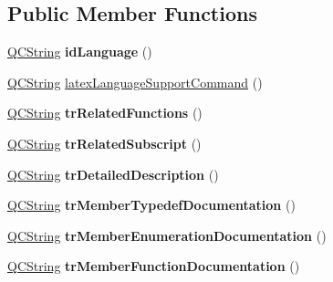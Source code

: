 \subsection*{Public Member Functions}
\begin{DoxyCompactItemize}
\item 
\mbox{\label{class_translator_dutch_aa43227f39ea2263932f49f851b350ea5}} 
\mbox{\hyperlink{class_q_c_string}{Q\+C\+String}} {\bfseries id\+Language} ()
\item 
\mbox{\hyperlink{class_q_c_string}{Q\+C\+String}} \mbox{\hyperlink{class_translator_dutch_a325c81f044aba5c86da2e2741a092119}{latex\+Language\+Support\+Command}} ()
\item 
\mbox{\label{class_translator_dutch_a9d8d21cbfa775b29b58c7b92de220959}} 
\mbox{\hyperlink{class_q_c_string}{Q\+C\+String}} {\bfseries tr\+Related\+Functions} ()
\item 
\mbox{\label{class_translator_dutch_aca493128ac9113eb36d54de5d59dd308}} 
\mbox{\hyperlink{class_q_c_string}{Q\+C\+String}} {\bfseries tr\+Related\+Subscript} ()
\item 
\mbox{\label{class_translator_dutch_af8b3e4701a4307f36ec8893112d26ff4}} 
\mbox{\hyperlink{class_q_c_string}{Q\+C\+String}} {\bfseries tr\+Detailed\+Description} ()
\item 
\mbox{\label{class_translator_dutch_ab3fbe35a840c10ff8bd8823f026f7673}} 
\mbox{\hyperlink{class_q_c_string}{Q\+C\+String}} {\bfseries tr\+Member\+Typedef\+Documentation} ()
\item 
\mbox{\label{class_translator_dutch_a37d85a35da1541a40c14fd24c0d485ca}} 
\mbox{\hyperlink{class_q_c_string}{Q\+C\+String}} {\bfseries tr\+Member\+Enumeration\+Documentation} ()
\item 
\mbox{\label{class_translator_dutch_a13fe45656ab869d15e0b573af4c00df7}} 
\mbox{\hyperlink{class_q_c_string}{Q\+C\+String}} {\bfseries tr\+Member\+Function\+Documentation} ()
\item 
\mbox{\label{class_translator_dutch_a73e4d80bbf93df9b21c2fa6c22dfde4a}} 

\end{DoxyCompactItemize}
